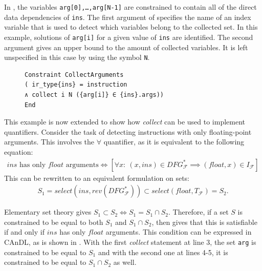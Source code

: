     \noindent
    In , the variables \texttt{arg[0],\dots,arg[N-1]}
    are constrained to contain all of the direct data dependencies of
    \texttt{ins}.
    The first argument of  specifies the name of an index
    variable that is used to detect which variables belong to the collected set.
    In this example, solutions of \texttt{arg[i]} for a given value
    of \texttt{ins} are identified.
    The second argument gives an upper bound to the amount of collected
    variables.
    It is left unspecified in this case by using the symbol \texttt{N}.

\begin{figure}[t]
\begin{lstlisting}[language=CAnDL,label={fig:simplecollect},caption=
   {Simple {\it collect} example in CAnDL: direct data dependencies of
    {\tt ins} are collected.\leftskip=0pt\rightskip=0pt}]
Constraint CollectArguments
( ir_type{ins} = instruction
∧ collect i N ({arg[i]} ∈ {ins}.args))
End
\end{lstlisting}
\end{figure}

    This example is now extended to show how {\it collect} can be used to
    implement quantifiers.
    Consider the task of detecting instructions with only floating-point
    arguments.
    This involves the $\forall$ quantifier, as it is equivalent to
    the following equation:
    \begin{align}
        ins\text{ has only }float\text{ arguments}\iff
        \left[\forall x\colon\ (x,ins)\in DFG_\mathcal F^*\implies(float,x)\in I_\mathcal F\right]
        \label{fig:implication}
    \end{align}
    This can be rewritten to an equivalent formulation on sets:
    \begin{align*}
        S_1= select(ins,rev(DFG_\mathcal F^*))\subset select(float,T_\mathcal F)= S_2.
    \end{align*}
    
    Elementary set theory gives  $S_1\subset S_2\iff S_1 = S_1\cap S_2$.
    Therefore, if a set $S$ is constrained to be equal to both $S_1$ and
    $S_1\cap S_2$, then  gives that this is satisfiable if
    and only if $ins$ has only $float$ arguments.
    This condition can be expressed in CAnDL, as is shown in
    .
    With the first {\it collect} statement at line 3, the set \texttt{arg} is
    constrained to be equal to $S_1$ and with the second one at lines 4-5, it
    is constrained to be equal to $S_1\cap S_2$ as well.

